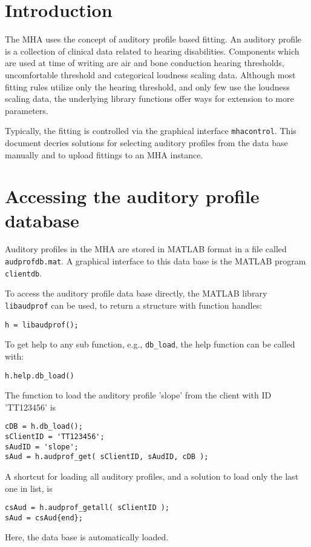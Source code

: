 \documentclass[11pt,a4paper,twoside]{article}
\begin{document}
\newpage
\MHAcopyright{}
\newpage
\tableofcontents
\newpage
\renewcommand{\leftmark}{\rightmark}

\section{Introduction}

The MHA uses the concept of auditory profile based fitting. An
auditory profile is a collection of clinical data related to hearing
disabilities. Components which are used at time of writing are air and
bone conduction hearing thresholds, uncomfortable threshold and
categorical loudness scaling data. Although most fitting rules utilize
only the hearing threshold, and only few use the loudness scaling
data, the underlying library functions offer ways for extension to
more parameters.

Typically, the fitting is controlled via the graphical interface
\verb!mhacontrol!. This document decries solutions for selecting
auditory profiles from the data base manually and to upload fittings
to an MHA instance.

\section{Accessing the auditory profile database}

Auditory profiles in the MHA are stored in MATLAB format in a file
called \verb!audprofdb.mat!. A graphical interface to this data base
is the MATLAB program \verb!clientdb!.

To access the auditory profile data base directly, the MATLAB library
\verb!libaudprof! can be used, to return a structure with function
handles:
\begin{verbatim}
h = libaudprof();
\end{verbatim}
To get help to any sub function, e.g., \verb!db_load!, the help
function can be called with:
\begin{verbatim}
h.help.db_load()
\end{verbatim}
The function to load the auditory profile 'slope' from the client with
ID 'TT123456' is
\begin{verbatim}
cDB = h.db_load();
sClientID = 'TT123456';
sAudID = 'slope';
sAud = h.audprof_get( sClientID, sAudID, cDB );
\end{verbatim}
A shortcut for loading all auditory profiles, and a solution to load
only the last one in list, is
\begin{verbatim}
csAud = h.audprof_getall( sClientID );
sAud = csAud{end};
\end{verbatim}
Here, the data base is automatically loaded.
\end{document}
